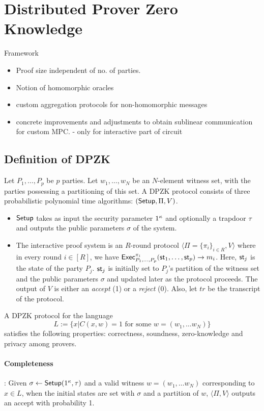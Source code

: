 \section{Distributed Prover Zero Knowledge}
Framework
\begin{itemize}
\item Proof size independent of no. of parties.
\item Notion of homomorphic oracles
\item custom aggregation protocols for non-homomorphic messages
\item concrete improvements and adjustments to obtain sublinear communication for custom MPC. - only for interactive part of circuit
\end{itemize}

\subsection{Definition of DPZK}
Let $P_1, \ldots, P_p$ be $p$ parties. Let $w_1, \ldots, w_N$ be an $N$-element witness set, with the parties possessing a partitioning of this set. A DPZK protocol consists of three probabilistic polynomial time algorithms: $(\mathsf{Setup}, \Pi, V)$. 
\begin{itemize}
\item $\mathsf{Setup}$ takes as input the security parameter $1^{\kappa}$ and optionally a trapdoor $\tau$ and outputs the public parameters $\sigma$ of the system.
\item The interactive proof system is an $R$-round protocol $\langle \Pi = \{\pi_i\}_{i \in R}, V \rangle$ where in every round $i \in [R]$, we have $\mathsf{Exec}^{\pi_i}_{P_1, \ldots, P_p}(\mathsf{st}_1, \ldots, \mathsf{st}_p) \rightarrow m_i$. Here, $\mathsf{st}_j$ is the state of the party $P_j$. $\mathsf{st}_j$ is initially set to $P_j$'s partition of the witness set and the public parameters $\sigma$ and updated later as the protocol proceeds. The output of $V$ is either an \textit{accept} (1) or a \textit{reject} (0). Also, let $tr$ be the transcript of the protocol.
\end{itemize}
A DPZK protocol for the language 
\[
L := \{ x | C(x, w) =1 \text{ for some } w = (w_1, \ldots w_N) \}
\]
satisfies the following properties: 
correctness, soundness, zero-knowledge and privacy among provers.
\paragraph{Completeness}: %
Given $\sigma \gets \mathsf{Setup}(1^{\kappa}, \tau)$ and a valid witness $w = (w_1, \ldots w_N)$ corresponding to $x \in L$, when the initial states are set with $\sigma$ and a partition of $w$, $\langle \Pi, V \rangle$ outputs an accept with probability 1.

